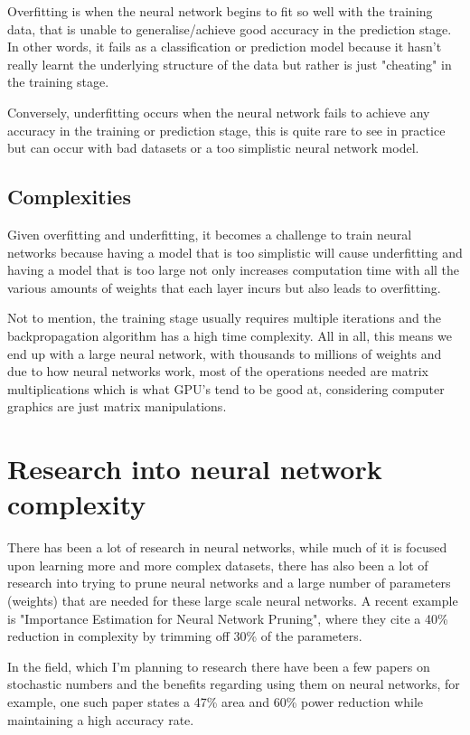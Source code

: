 \documentclass[a4paper,oneside,phd,etd]{BYUPhys}
\begin{document}
Overfitting is when the neural network begins to fit so well with the training data, that is unable to generalise/achieve good accuracy in the prediction stage. In other words, it fails as a classification or prediction model because it hasn't really learnt the underlying structure of the data but rather is just "cheating" in the training stage.

Conversely, underfitting occurs when the neural network fails to achieve any accuracy in the training or prediction stage, this is quite rare to see in practice but can occur with bad datasets or a too simplistic neural network model\cite{underfitting-machine-learning}.

\subsection{Complexities}
Given overfitting and underfitting, it becomes a challenge to train neural networks because having a model that is too simplistic will cause underfitting and having a model that is too large not only increases computation time with all the various amounts of weights that each layer incurs but also leads to overfitting\cite{model-complexity}. 

Not to mention, the training stage usually requires multiple iterations and the backpropagation algorithm has a high time complexity\cite{backprop-time-complexity}. All in all, this means we end up with a large neural network, with thousands to millions of weights and due to how neural networks work, most of the operations needed are matrix multiplications which is what GPU's tend to be good at, considering computer graphics are just matrix manipulations.

\section{Research into neural network complexity}
There has been a lot of research in neural networks, while much of it is focused upon learning more and more complex datasets\cite{research-1}\cite{research-2}\cite{research-3}, there has also been a lot of research into trying to prune neural networks and a large number of parameters (weights) that are needed for these large scale neural networks. A recent example is "Importance Estimation for Neural Network Pruning"\cite{molchanov2019taylor}, where they cite a 40\% reduction in complexity by trimming off 30\% of the parameters.

In the field, which I'm planning to research there have been a few papers on stochastic numbers and the benefits regarding using them on neural networks, for example, one such paper states a 47\% area and 60\% power reduction while maintaining a high accuracy rate\cite{8119196}. 
\end{document}

